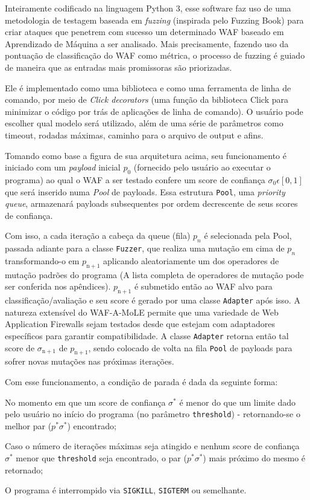 Inteiramente codificado na linguagem Python 3, esse software faz uso de uma metodologia de testagem baseada em \textit{fuzzing} (inspirada pelo Fuzzing Book) para criar ataques que penetrem com sucesso um determinado WAF baseado em Aprendizado de Máquina a ser analisado. Mais precisamente, fazendo uso da pontuação de classificação do WAF como métrica, o processo de fuzzing é guiado de maneira que as entradas mais promissoras são priorizadas.

Ele é implementado como uma biblioteca e como uma ferramenta de linha de comando, por meio de \textit{Click decorators} (uma função da biblioteca Click para minimizar o código por trás de aplicações de linha de comando). O usuário pode escolher qual modelo será utilizado, além de uma série de parâmetros como timeout, rodadas máximas, caminho para o arquivo de output e afins.

Tomando como base a figura de sua arquitetura acima, seu funcionamento é iniciado com um \textit{payload} inicial $p_0$ (fornecido pelo usuário ao executar o programa) ao qual o WAF a ser testado confere um score de confiança $\sigma_0 \epsilon [0, 1]$ que será inserido numa \textit{Pool} de payloads. Essa estrutura \verb+Pool+, uma \textit{priority queue}, armazenará payloads subsequentes por ordem decrescente de seus scores de confiança.

Com isso, a cada iteração a cabeça da queue (fila) $p_n$ é selecionada pela Pool, passada adiante para a classe \verb+Fuzzer+, que realiza uma mutação em cima de $p_n$ transformando-o em $p_{\mathrm{n+1}}$ aplicando aleatoriamente um dos operadores de mutação padrões do programa (A lista completa de operadores de mutação pode ser conferida nos apêndices). $p_{\mathrm{n+1}}$ é submetido então ao WAF alvo para classificação/avaliação e seu score é gerado por uma classe \verb+Adapter+ após isso. A natureza extensível do WAF-A-MoLE permite que uma variedade de Web Application Firewalls sejam testados desde que estejam com adaptadores específicos para garantir compatibilidade. A classe \verb+Adapter+ retorna então tal score de $\sigma_{\mathrm{n+1}}$ de $p_{\mathrm{n+1}}$, sendo colocado de volta na fila \verb+Pool+ de payloads para sofrer novas mutações nas próximas iterações.

\bigskip 

Com esse funcionamento, a condição de parada é dada da seguinte forma:
\begin{alineas}
\item No momento em que um score de confiança $\sigma^*$ é menor do que um limite dado pelo usuário no início do programa (no parâmetro \verb+threshold+) - retornando-se o melhor par ($p^* \sigma^*$) encontrado;
\item Caso o número de iterações máximas seja atingido e nenhum score de confiança $\sigma^*$ menor que \verb+threshold+ seja encontrado, o par ($p^* \sigma^*$) mais próximo do mesmo é retornado;
\item O programa é interrompido via \verb+SIGKILL+, \verb+SIGTERM+ ou semelhante.
\end{alineas}

